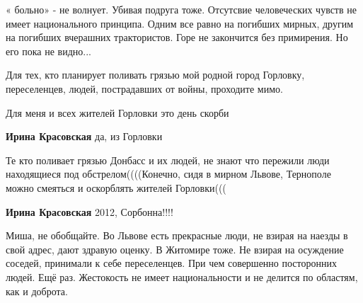 \begin{itemize}
« больно» - не волнует. Убивая подруга тоже. Отсутсвие человеческих чувств не
имеет национального принципа. Одним все равно на погибших мирных, другим на
погибших вчерашних трактористов. Горе не закончится без примирения. Но его пока
не видно...


 

Для тех, кто планирует поливать грязью мой родной город Горловку, переселенцев,
людей, пострадавших от войны, проходите мимо.

Для меня и всех жителей Горловки это день скорби

\begin{itemize}
 
\textbf{Ирина Красовская} да, из Горловки

 
Те кто поливает грязью Донбасс и их людей, не знают что пережили люди
находящиеся под обстрелом((((Конечно, сидя в мирном Львове, Тернополе можно
смеяться и оскорблять жителей Горловки(((

 
\textbf{Ирина Красовская} 2012, Сорбонна!!!!

 
Миша, не обобщайте. Во Львове есть прекрасные люди, не взирая на наезды в свой
адрес, дают здравую оценку. В Житомире тоже. Не взирая на осуждение соседей,
принимали к себе переселенцев. При чем совершенно посторонних людей. Ещё раз.
Жестокость не имеет национальности и не делится по областям, как и доброта.


\end{itemize}
\end{itemize}

